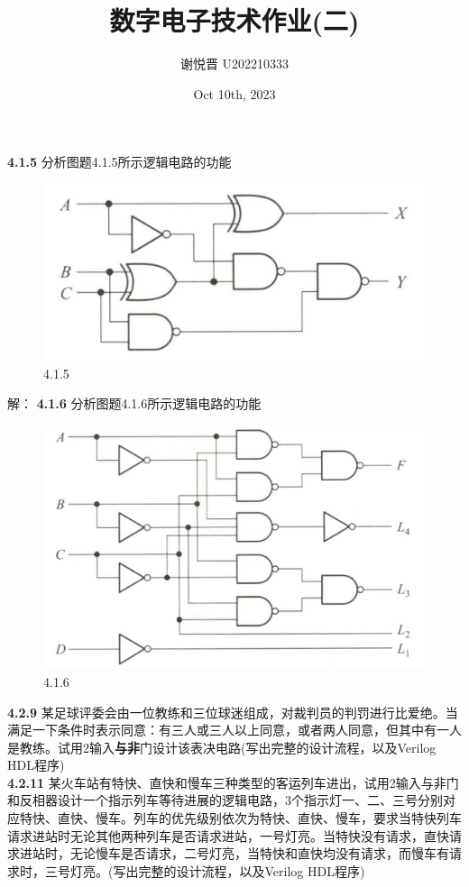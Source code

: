 \documentclass[a4paper,11pt,UTF8]{article}
\title{数字电子技术作业(二)}
\author{谢悦晋 \quad U202210333}
\date{Oct 10th, 2023 }
\begin{document}
\maketitle
\textbf{4.1.5} 分析图题4.1.5所示逻辑电路的功能\\
\begin{figure}[H]
	\centering
	\includegraphics[scale=0.2]{SD4.1.5}
	\caption{4.1.5}
\end{figure}
解：
\textbf{4.1.6} 分析图题4.1.6所示逻辑电路的功能\\
\begin{figure}[H]
	\centering
	\includegraphics[scale=0.15]{SD4.1.6}
	\caption{4.1.6}
\end{figure}
\textbf{4.2.9} 某足球评委会由一位教练和三位球迷组成，对裁判员的判罚进行比爱绝。当满足一下条件时表示同意：有三人或三人以上同意，或者两人同意，但其中有一人是教练。试用2输入\textbf{与非}门设计该表决电路(写出完整的设计流程，以及Verilog HDL程序)\\
\textbf{4.2.11} 某火车站有特快、直快和慢车三种类型的客运列车进出，试用2输入与非门和反相器设计一个指示列车等待进展的逻辑电路，3个指示灯一、二、三号分别对应特快、直快、慢车。列车的优先级别依次为特快、直快、慢车，要求当特快列车请求进站时无论其他两种列车是否请求进站，一号灯亮。当特快没有请求，直快请求进站时，无论慢车是否请求，二号灯亮，当特快和直快均没有请求，而慢车有请求时，三号灯亮。(写出完整的设计流程，以及Verilog HDL程序)\\
\end{document}
